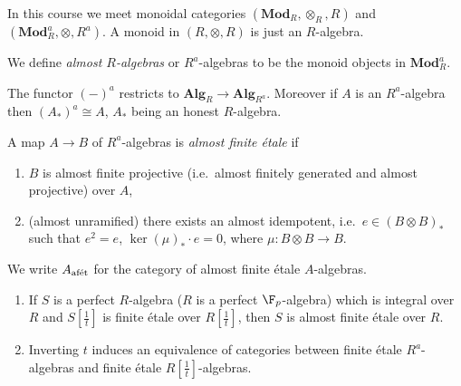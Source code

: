 \documentclass[a4paper]{article}
\renewcommand{\c}[1]{\mathbf{#1}}
\newcommand{\Mod}{{\c{Mod}}}
\begin{document}
\begin{eg}
  In this course we meet monoidal categories \((\Mod_R, \otimes_R, R)\) and \((\Mod_R^a, \otimes, R^a)\). A monoid in \((R, \otimes, R)\) is just an \(R\)-algebra.
\end{eg}

We define \emph{almost \(R\)-algebras} or \(R^a\)-algebras to be the monoid objects in \(\Mod_R^a\).

The functor \((-)^a\) restricts to \(\c{Alg}_R \to \c{Alg}_{R^a}\). Moreover if \(A\) is an \(R^a\)-algebra then \((A_*)^a \cong A\), \(A_*\) being an honest \(R\)-algebra.

\begin{definition}
  A map \(A \to B\) of \(R^a\)-algebras is \emph{almost finite étale} if
  \begin{enumerate}
  \item \(B\) is almost finite projective (i.e.\ almost finitely generated and almost projective) over \(A\),
  \item (almost unramified) there exists an almost idempotent, i.e.\ \(e \in (B \otimes B)_*\) such that \(e^2 = e\), \(\ker (\mu)_* \cdot e = 0\), where \(\mu: B \otimes B \to B\).
  \end{enumerate}
  We write \(A_{\textup{afét}}\) for the category of almost finite étale \(A\)-algebras.
\end{definition}

\begin{theorem}\leavevmode
  \begin{enumerate}
  \item If \(S\) is a perfect \(R\)-algebra (\(R\) is a perfect \(\F_p\)-algebra) which is integral over \(R\) and \(S[\frac{1}{t}]\) is finite étale over \(R[\frac{1}{t}]\), then \(S\) is almost finite étale over \(R\).
  \item Inverting \(t\) induces an equivalence of categories between finite étale \(R^a\)-algebras and finite étale \(R[\frac{1}{t}]\)-algebras.
  \end{enumerate}
\end{theorem}
\end{document}
